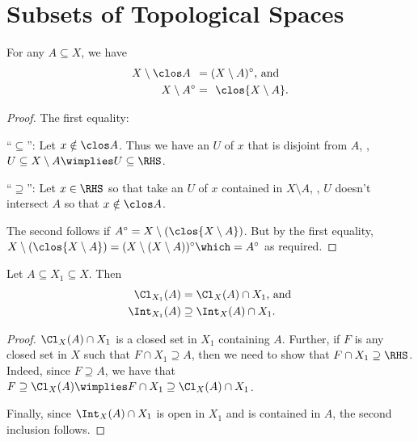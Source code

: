 	
\section{Subsets of Topological Spaces}

	\begin{lem}\label{LEM: complements of clos and int}
		For any $A\subseteq X$, we have
		\begin{align*}
			X\setminus\clos A\phantom{^\circ} & = (X\setminus A)^\circ\text{, and}\\
			X\setminus A^\circ & = \phantom{(}\clos{X\setminus A}\text.
		\end{align*}
	\end{lem}
	
	\begin{proof}
		The first equality:
		\begin{subproof}
			``$\subseteq$'': Let $x\notin \clos A$. Thus we have an \onbd $U$ of $x$ that is disjoint from $A$, \ie, $U\subseteq X\setminus A\wimplies U\subseteq \RHS$.
		
			\noindent``$\supseteq$'': Let $x\in\RHS$ so that take an \onbd $U$ of $x$ contained in $X\setminus A$, \ie, $U$ doesn't intersect $A$ so that $x\notin \clos A$.\qedhere
		\end{subproof}
		
		The second follows if $A^\circ = X\setminus(\clos{X\setminus A})$. But by the first equality, $X\setminus(\clos{X\setminus A}) = (X\setminus(X\setminus A))^\circ\which = A^\circ$ as required.
	\end{proof}
	
	
	\begin{lem}\label{LEM: clos in subspaces}
		Let $A\subseteq X_1\subseteq X$. Then
		\begin{align*}
			\Cl_{X_1}(A) & = \Cl_X(A)\cap X_1\text{, and}\\
			\Int_{X_1}(A) & \supseteq \Int_X(A)\cap X_1\text.
		\end{align*}
	\end{lem}
	
	\begin{proof}
		$\Cl_X(A)\cap X_1$ is a closed set in $X_1$ containing $A$. Further, if $F$ is any closed set in $X$ such that $F\cap X_1\supseteq A$, then we need to show that $F\cap X_1\supseteq \RHS$. Indeed, since $F\supseteq A$, we have that $F\supseteq \Cl_X(A)\wimplies F\cap X_1\supseteq\Cl_X(A)\cap X_1$.
		
		Finally, since $\Int_X(A)\cap X_1$ is open in $X_1$ and is contained in $A$, the second inclusion follows.
	\end{proof}
	
